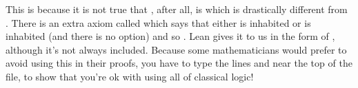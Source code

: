 \documentclass[letterpaper,10pt,english]{sphinxmanual}
\begin{document}
\sphinxAtStartPar
This is because it is not true that  , after all,
 is  which is drastically different from .
There is an extra axiom called  which says that
either  is inhabited or  is inhabited (and there is no  option)
and so .
Lean gives it to us in the form of , although it’s not always included.
Because some mathematicians would prefer to avoid using this in their proofs,
you have to type the lines  and 
near the top of the file, to show that you’re ok with using all of classical logic!
\end{document}
